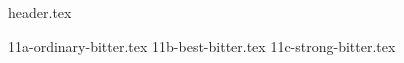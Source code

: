 \clearpage
{}
\divisorLine
{header.tex}
\begin{multicols*}{2}
{11a-ordinary-bitter.tex}
{11b-best-bitter.tex}
{11c-strong-bitter.tex}
\end{multicols*}